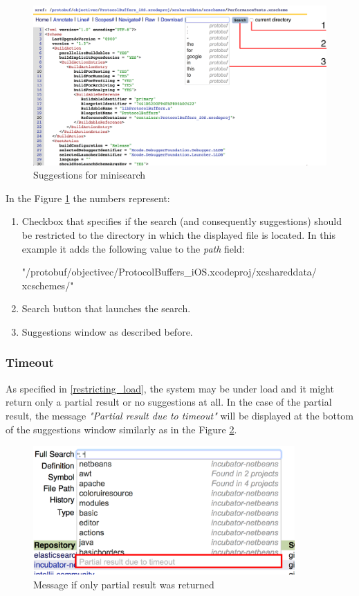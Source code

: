 \begin{figure}[htbp]
    \centering
    \includegraphics[width=145mm]{../img/minisearch.png}
    \caption{Suggestions for minisearch}
    \label{suggestions_minisearch}
\end{figure}

In the Figure \ref{suggestions_minisearch} the numbers represent:
\begin{enumerate}
    \item Checkbox that specifies if the search (and consequently suggestions) should be restricted to the directory
    in which the displayed file is located. In this example it adds the following value to the \textit{path} field:
\begin{code}
"/protobuf/objectivec/ProtocolBuffers_iOS.xcodeproj/xcshareddata/
xcschemes/"
\end{code}
    \item Search button that launches the search.
    \item Suggestions window as described before.
\end{enumerate}

\subsubsection{Timeout}
As specified in \ref{restricting_load}, the system may be under load and it might return only a partial result or no
suggestions at all. In the case of the partial result, the message \textit{"Partial result due to timeout"} will be
displayed at the bottom of the suggestions window similarly as in the Figure \ref{partial_result}.
\begin{figure}[htbp]
    \centering
    \includegraphics[width=100mm]{../img/partial_result.png}
    \caption{Message if only partial result was returned}
    \label{partial_result}
\end{figure}

